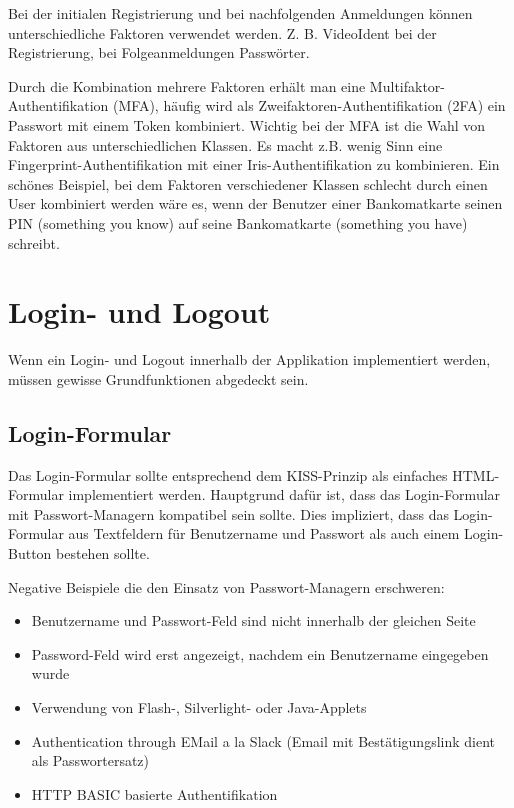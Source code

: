 Bei der initialen Registrierung und bei nachfolgenden Anmeldungen können unterschiedliche Faktoren verwendet werden. Z. B. VideoIdent bei der Registrierung, bei Folgeanmeldungen Passwörter.

Durch die Kombination mehrere Faktoren erhält man eine Multifaktor-Authentifikation (MFA), häufig wird als Zweifaktoren-Authentifikation (2FA) ein Passwort mit einem Token kombiniert. Wichtig bei der MFA ist die Wahl von Faktoren aus unterschiedlichen Klassen. Es macht z.B. wenig Sinn eine Fingerprint-Authentifikation mit einer Iris-Authentifikation zu kombinieren. Ein schönes Beispiel, bei dem Faktoren verschiedener Klassen schlecht durch einen User kombiniert werden wäre es, wenn der Benutzer einer Bankomatkarte seinen PIN (something you know) auf seine Bankomatkarte (something you have) schreibt.

\section{Login- und Logout}

Wenn ein Login- und Logout innerhalb der Applikation implementiert werden, müssen gewisse Grundfunktionen abgedeckt sein.

\subsection{Login-Formular}

Das Login-Formular sollte entsprechend dem KISS-Prinzip als einfaches HTML-Formular implementiert werden. Hauptgrund dafür ist, dass das Login-Formular mit Passwort-Managern kompatibel sein sollte. Dies impliziert, dass das Login-Formular aus Textfeldern für Benutzername und Passwort als auch einem Login-Button bestehen sollte.

Negative Beispiele die den Einsatz von Passwort-Managern erschweren:

\begin{itemize}
	\item Benutzername und Passwort-Feld sind nicht innerhalb der gleichen Seite
	\item Password-Feld wird erst angezeigt, nachdem ein Benutzername eingegeben wurde
	\item Verwendung von Flash-, Silverlight- oder Java-Applets
	\item Authentication through EMail a la Slack (Email mit Bestätigungslink dient als Passwortersatz)
	\item HTTP BASIC basierte Authentifikation
\end{itemize}

